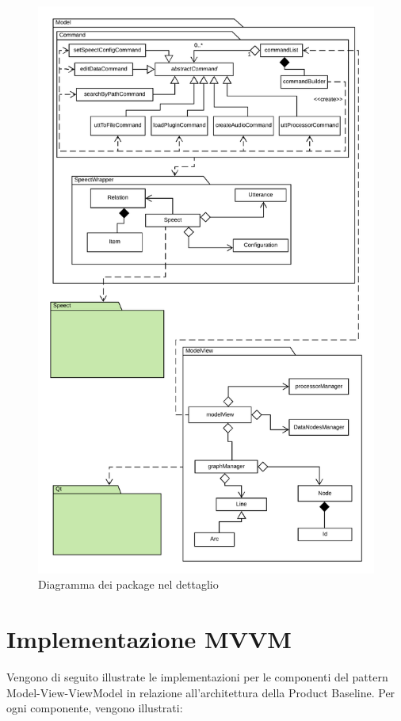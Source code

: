 \documentclass[openany,12pt,a4paper]{report}
\begin{document}
	\newpage
	
	\begin{figure}[H]
		\includegraphics[scale=0.63]{PackageDiagram2}
		\centering
		\caption{Diagramma dei package nel dettaglio}
	\end{figure}
	
	\chapter{Implementazione MVVM}
	
	Vengono di seguito illustrate le implementazioni per le componenti del pattern Model-View-ViewModel in relazione all'architettura della Product Baseline. Per ogni componente, vengono illustrati:
	
\end{document}
